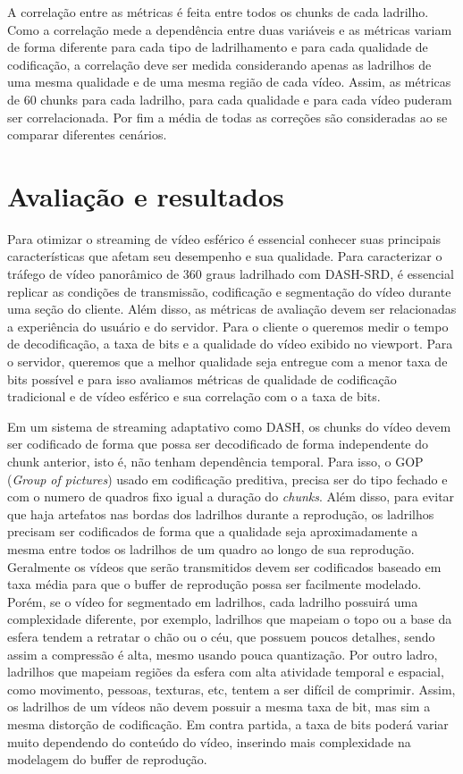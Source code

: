 A correlação entre as métricas é feita entre todos os chunks de cada ladrilho. Como a correlação mede a dependência entre duas variáveis e as métricas variam de forma diferente para cada tipo de ladrilhamento e para cada qualidade de codificação, a correlação deve ser medida considerando apenas as ladrilhos de uma mesma qualidade e de uma mesma região de cada vídeo. Assim, as métricas de 60 chunks para cada ladrilho, para cada qualidade e para cada vídeo puderam ser correlacionada. Por fim a média de todas as correções são consideradas ao se comparar diferentes cenários.


\chapter{Avaliação e resultados}\label{Cap:Evaluation}

Para otimizar o streaming de vídeo esférico é essencial conhecer suas principais características que afetam seu desempenho e sua qualidade. Para caracterizar o tráfego de vídeo panorâmico de 360 graus ladrilhado com DASH-SRD, é essencial replicar as condições de transmissão, codificação e segmentação do vídeo durante uma seção do cliente. Além disso, as métricas de avaliação devem ser relacionadas a experiência do usuário e do servidor. Para o cliente o queremos medir o tempo de decodificação, a taxa de bits e a qualidade do vídeo exibido no viewport. Para o servidor, queremos que a melhor qualidade seja entregue com a menor taxa de bits possível e para isso avaliamos métricas de qualidade de codificação tradicional e de vídeo esférico e sua correlação com o a taxa de bits.

Em um sistema de streaming adaptativo como DASH, os chunks do vídeo devem ser codificado de forma que possa ser decodificado de forma independente do chunk anterior, isto é, não tenham dependência temporal. Para isso, o GOP (\textit{Group of pictures}) usado em codificação preditiva, precisa ser do tipo fechado e com o numero de quadros fixo igual a duração do \textit{chunks}. Além disso, para evitar que haja artefatos nas bordas dos ladrilhos durante a reprodução, os ladrilhos precisam ser codificados de forma que a qualidade seja aproximadamente a mesma entre todos os ladrilhos de um quadro ao longo de sua reprodução. Geralmente os vídeos que serão transmitidos devem ser codificados baseado em taxa média para que o buffer de reprodução possa ser facilmente modelado. Porém, se o vídeo for segmentado em ladrilhos, cada ladrilho possuirá uma complexidade diferente, por exemplo, ladrilhos que mapeiam o topo ou a base da esfera tendem a retratar o chão ou o céu, que possuem poucos detalhes, sendo assim a compressão é alta, mesmo usando pouca quantização. Por outro ladro, ladrilhos que mapeiam regiões da esfera com alta atividade temporal e espacial, como movimento, pessoas, texturas, etc, tentem a ser difícil de comprimir. Assim, os ladrilhos de um vídeos não devem possuir a mesma taxa de bit, mas sim a mesma distorção de codificação. Em contra partida, a taxa de bits poderá variar muito dependendo do conteúdo do vídeo, inserindo mais complexidade na modelagem do buffer de reprodução.


